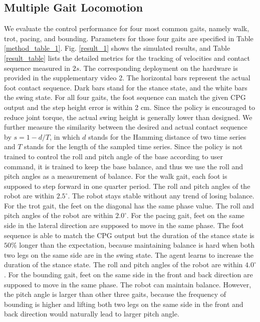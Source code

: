 \documentclass[letterpaper, 10 pt, journal, twoside]{IEEEtran} %
\begin{document}
\subsection{Multiple Gait Locomotion}\label{sec_result_gait}
We evaluate the control performance for four most common gaits, namely walk, trot, pacing, and bounding. Parameters for those four gaits are specified in Table \ref{method_table_1}. Fig. \ref{result_1} shows the simulated results, and Table \ref{result_table} lists the detailed metrics for the tracking of velocities and contact sequence measured in $2s$. The corresponding deployment on the hardware is provided in the supplementary video 2. The horizontal bars represent the actual foot contact sequence. Dark bars stand for the stance state, and the white bars the swing state. For all four gaits, the foot sequence can match the given CPG output and the step height error is within 2 cm. Since the policy is encouraged to reduce joint torque, the actual swing height is generally lower than designed. We further measure the similarity between the desired and actual contact sequence by $s=1-d/T$, in which $d$ stands for the Hamming distance of two time series and $T$ stands for the length of the sampled time series. Since the policy is not trained to control the roll and pitch angle of the base according to user command, it is trained to keep the base balance, and thus we use the roll and pitch angles as a measurement of balance. For the walk gait, each foot is supposed to step forward in one quarter period. The roll and pitch angles of the robot are within $2.5^{\circ}$. The robot stays stable without any trend of losing balance. For the trot gait, the feet on the diagonal has the same phase value. The roll and pitch angles of the robot are within $2.0^{\circ}$. For the pacing gait, feet on the same side in the lateral direction are supposed to move in the same phase. The foot sequence is able to match the CPG output but the duration of the stance state is $50\%$ longer than the expectation, because maintaining balance is hard when both two legs on the same side are in the swing state. The agent learns to increase the duration of the stance state. The roll and pitch angles of the robot are within $4.0^{\circ}$. For the bounding gait, feet on the same side in the front and back direction are supposed to move in the same phase. The robot can maintain balance. However, the pitch angle is larger than other three gaits, because the frequency of bounding is higher and lifting both two legs on the same side in the front and back direction would naturally lead to larger pitch angle.
\end{document}
